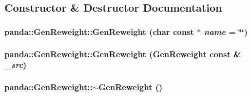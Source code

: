 \subsection{Constructor \& Destructor Documentation}
\hypertarget{classpanda_1_1GenReweight_ae943542cdd41bccabf28c8221282a274}{
\subsubsection[{GenReweight}]{\setlength{\rightskip}{0pt plus 5cm}panda::GenReweight::GenReweight (char const $\ast$ {\em name} = {\ttfamily \char`\"{}\char`\"{}})}}
\label{classpanda_1_1GenReweight_ae943542cdd41bccabf28c8221282a274}
\hypertarget{classpanda_1_1GenReweight_ad7f13e4845484285cdf1eb1b74d325c5}{
\subsubsection[{GenReweight}]{\setlength{\rightskip}{0pt plus 5cm}panda::GenReweight::GenReweight ({\bf GenReweight} const \& {\em \_\-src})}}
\label{classpanda_1_1GenReweight_ad7f13e4845484285cdf1eb1b74d325c5}
\hypertarget{classpanda_1_1GenReweight_a0e50cc06e0930a7b5516e448df2a00c5}{
\subsubsection[{$\sim$GenReweight}]{\setlength{\rightskip}{0pt plus 5cm}panda::GenReweight::$\sim$GenReweight ()}}
\label{classpanda_1_1GenReweight_a0e50cc06e0930a7b5516e448df2a00c5}


